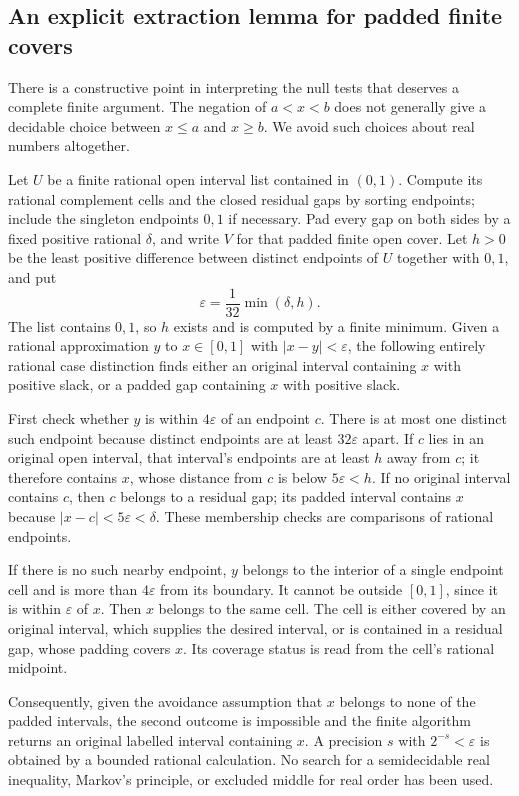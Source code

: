 \subsection{An explicit extraction lemma for padded finite covers}

There is a constructive point in interpreting the null tests that deserves
a complete finite argument.  The negation of $a<x<b$ does not generally
give a decidable choice between $x\le a$ and $x\ge b$.  We avoid such
choices about real numbers altogether.

Let $U$ be a finite rational open interval list contained in $(0,1)$.
Compute its rational complement cells and the closed residual gaps by
sorting endpoints; include the singleton endpoints $0,1$ if necessary.
Pad every gap on both sides by a fixed positive rational $\delta$, and
write $V$ for that padded finite open cover.  Let $h>0$ be the least
positive difference between distinct endpoints of $U$ together with
$0,1$, and put
\[
 \varepsilon=\frac1{32}\min(\delta,h).
\]
The list contains $0,1$, so $h$ exists and is computed by a finite minimum.
Given a rational approximation $y$ to $x\in[0,1]$ with
$|x-y|<\varepsilon$, the following entirely rational case distinction
finds either an original interval containing $x$ with positive slack,
or a padded gap containing $x$ with positive slack.

First check whether $y$ is within $4\varepsilon$ of an endpoint $c$.
There is at most one distinct such endpoint because distinct endpoints
are at least $32\varepsilon$ apart.  If $c$ lies in an original open
interval, that interval's endpoints are at least $h$ away from $c$;
it therefore contains $x$, whose distance from $c$ is below
$5\varepsilon<h$.  If no original interval contains $c$, then $c$
belongs to a residual gap; its padded interval contains $x$ because
$|x-c|<5\varepsilon<\delta$.  These membership checks are comparisons
of rational endpoints.

If there is no such nearby endpoint, $y$ belongs to the interior of a
single endpoint cell and is more than $4\varepsilon$ from its boundary.
It cannot be outside $[0,1]$, since it is within $\varepsilon$ of $x$.
Then $x$ belongs to the same cell.  The cell is either covered by an
original interval, which supplies the desired interval, or is contained
in a residual gap, whose padding covers $x$.  Its coverage status is
read from the cell's rational midpoint.

Consequently, given the avoidance assumption that $x$ belongs to none of
the padded intervals, the second outcome is impossible and the finite
algorithm returns an original labelled interval containing $x$.  A
precision $s$ with $2^{-s}<\varepsilon$ is obtained by a bounded rational
calculation.  No search for a semidecidable real inequality, Markov's
principle, or excluded middle for real order has been used.

